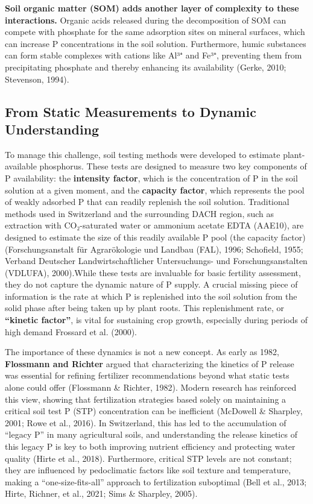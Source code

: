 \documentclass[
  a4paper,
]{article}
\begin{document}
\textbf{Soil organic matter (SOM) adds another layer of complexity to
these interactions.} Organic acids released during the decomposition of
SOM can compete with phosphate for the same adsorption sites on mineral
surfaces, which can increase P concentrations in the soil solution.
Furthermore, humic substances can form stable complexes with cations
like Al³⁺ and Fe³⁺, preventing them from precipitating phosphate and
thereby enhancing its availability (Gerke, 2010; Stevenson, 1994).

\subsection{From Static Measurements to Dynamic
Understanding}\label{from-static-measurements-to-dynamic-understanding}

To manage this challenge, soil testing methods were developed to
estimate plant-available phosphorus. These tests are designed to measure
two key components of P availability: the \textbf{intensity factor},
which is the concentration of P in the soil solution at a given moment,
and the \textbf{capacity factor}, which represents the pool of weakly
adsorbed P that can readily replenish the soil solution. Traditional
methods used in Switzerland and the surrounding DACH region, such as
extraction with CO₂-saturated water or ammonium acetate EDTA (AAE10),
are designed to estimate the size of this readily available P pool (the
capacity factor) (Forschungsanstalt für Agrarökologie und Landbau (FAL),
1996; Schofield, 1955; Verband Deutscher Landwirtschaftlicher
Untersuchungs- und Forschungsanstalten (VDLUFA), 2000).While these tests
are invaluable for basic fertility assessment, they do not capture the
dynamic nature of P supply. A crucial missing piece of information is
the rate at which P is replenished into the soil solution from the solid
phase after being taken up by plant roots. This replenishment rate, or
\textbf{``kinetic factor''}, is vital for sustaining crop growth,
especially during periods of high demand Frossard et al. (2000).

The importance of these dynamics is not a new concept. As early as 1982,
\textbf{Flossmann and Richter} argued that characterizing the kinetics
of P release was essential for refining fertilizer recommendations
beyond what static tests alone could offer (Flossmann \& Richter, 1982).
Modern research has reinforced this view, showing that fertilization
strategies based solely on maintaining a critical soil test P (STP)
concentration can be inefficient (McDowell \& Sharpley, 2001; Rowe et
al., 2016). In Switzerland, this has led to the accumulation of ``legacy
P'' in many agricultural soils, and understanding the release kinetics
of this legacy P is key to both improving nutrient efficiency and
protecting water quality (Hirte et al., 2018). Furthermore, critical STP
levels are not constant; they are influenced by pedoclimatic factors
like soil texture and temperature, making a ``one-size-fits-all''
approach to fertilization suboptimal (Bell et al., 2013; Hirte, Richner,
et al., 2021; Sims \& Sharpley, 2005).
\end{document}
